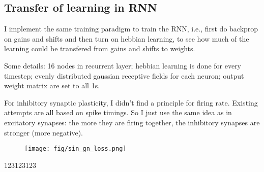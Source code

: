 \documentclass[12pt, a4paper]{article}
\begin{document}
\newpage

\subsection*{Transfer of learning in RNN}

I implement the same training paradigm to train the RNN, i.e., first do backprop on gains and shifts and then turn on hebbian learning, to see how much of the learning could be transfered from gains and shifts to weights.

Some details: 16 nodes in recurrent layer; hebbian learning is done for every timestep; evenly distributed gaussian receptive fields for each neuron; output weight matrix are set to all 1s.

For inhibitory synaptic plasticity, I didn't find a principle for firing rate. Existing attempts are all based on spike timings. So I just use the same idea as in excitatory synapses: the more they are firing together, the inhibitory synapses are stronger (more negative).

\begin{figure}[H]
    \centering
    \texttt{[image: fig/sin\_gn\_loss.png]} \\
    \label{fig:1}
\end{figure}

123123123

\newpage
\end{document}
